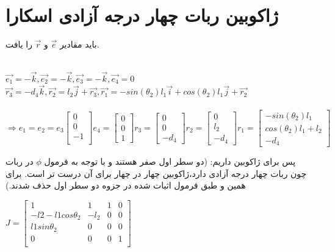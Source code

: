 \documentclass[12pt]{article}
\begin{document}
	\section{ژاکوبین ربات چهار درجه آزادی اسکارا}
	باید مقادیر
	 $\vec{e}$
	 و 
	 $\vec{r}$
	 را یافت.
	 \begin{latin}
	 	~\\
	 	$
	 	\vec{e_1} = -\vec{k} , \vec{e_2} = -\vec{k}, \vec{e_3} = -\vec{k}, \vec{e_4} = 0
	 	$
	 	\\
	 	$
	 	\vec{r_3} = -d_4\vec{k} , \vec{r_2} = l_2 \vec{j} + \vec{r_3}, \vec{r_1} = -sin(\theta_2) l_1 \vec{i} + cos(\theta_2 )l_1 \vec{j} + \vec{r_2} 
	 	$
	 	\\\\
	 	$
	 	\Rightarrow
	 	e_1 = e_2 = e_3 \begin{bmatrix}
	 		0 \\
	 		0 \\
	 		-1 \\
	 	\end{bmatrix}
	   e_4 = \begin{bmatrix}
	   	0 \\
	   	0 \\
	   	1
	   \end{bmatrix}	   
	 	r_3 = \begin{bmatrix}
	 		0 \\
	 		0 \\
	 		-d_4
	 	\end{bmatrix}
	 	r_2 = \begin{bmatrix}
	 		0 \\
	 		l_2 \\
	 		-d_4
	 	\end{bmatrix}
	 	r_1 = \begin{bmatrix}
	 		-sin(\theta_2)l_1 \\
	 		cos(\theta_2)l_1 + l_2 \\
	 		-d_4
	 	\end{bmatrix}
	 	$
	 \end{latin}
	 پس برای ژاکوبین داریم: (دو سطر اول صفر هستند و با توجه به فرمول $\phi$ در ربات  چون ربات چهار درجه آزادی دارد،‌ژاکوبین چهار در چهار برای آن درست تر است. برای همین و طبق فرمول اثبات شده در جزوه دو سطر اول حذف شدند.)
	 \begin{latin}
	 	$
	 	J = \begin{bmatrix}
	 		1 & 1 & 1 & 0 \\
	 		-l2 -l1 cos \theta_2  & -l_2 & 0 & 0 \\
	 		l1 sin \theta_2 & 0 & 0 & 0 \\
	 		0 & 0 & 0 &  1 \\
	 	\end{bmatrix}
	 	$
	 \end{latin}
	 
\end{document}
